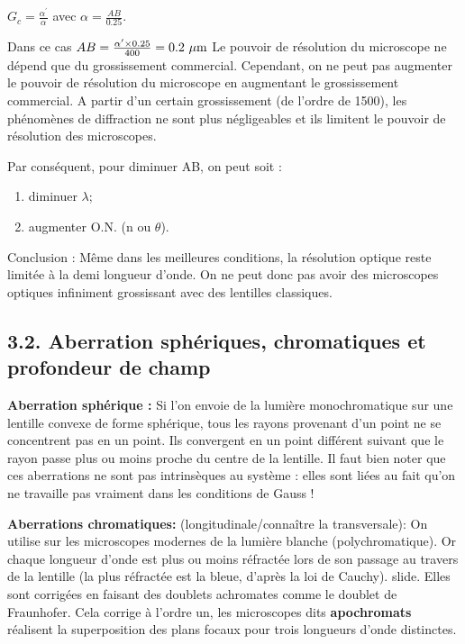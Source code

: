 \documentclass[french, a4paper, 10pt, twocolumn, landscape]{article}
\begin{document}
$G_c=\frac{\alpha^\prime}{\alpha}$ avec $\alpha=\frac{AB}{0.25}$.\medskip

Dans ce cas $AB = \frac{\alpha^\prime \times 0.25}{400} = 0.2~\rm\mu m$ Le pouvoir de résolution du microscope ne dépend que du grossissement commercial. Cependant, on ne peut pas augmenter le pouvoir de résolution du microscope en augmentant le grossissement commercial. A partir d’un certain grossissement (de l’ordre de 1500), les phénomènes de diffraction ne sont plus négligeables et ils limitent le pouvoir de résolution des microscopes.\medskip

Par conséquent, pour diminuer AB, on peut soit : 
\begin{enumerate}
	\item diminuer $\lambda$;
	\item augmenter O.N. (n ou $\theta$).
\end{enumerate}

Conclusion : Même dans les meilleures conditions, la résolution optique reste limitée à la demi longueur d'onde. On ne peut donc pas avoir des microscopes optiques infiniment grossissant avec des lentilles classiques.

\subsection*{3.2. Aberration sphériques, chromatiques et  profondeur de champ}

\textbf{Aberration sphérique :} Si l’on envoie de la lumière monochromatique sur une lentille convexe de forme sphérique, tous les rayons provenant d’un point ne se concentrent pas en un point. Ils convergent en un point différent suivant que le rayon passe plus ou moins proche du centre de la lentille. Il faut bien noter que ces aberrations ne sont pas intrinsèques au système : elles sont liées au fait qu’on ne travaille pas vraiment dans les conditions de Gauss ! 

\textbf{Aberrations chromatiques:} (longitudinale/connaître la transversale): On utilise sur les microscopes
modernes de la lumière blanche (polychromatique). Or chaque longueur d’onde est plus ou moins réfractée lors de son passage au travers de la lentille (la plus réfractée est la bleue, d’après la loi de Cauchy).
slide. Elles sont corrigées en faisant des doublets achromates comme le doublet de Fraunhofer. Cela corrige à l’ordre un, les microscopes dits \textbf{apochromats} réalisent la superposition des plans focaux pour trois longueurs d’onde distinctes.
\end{document}
